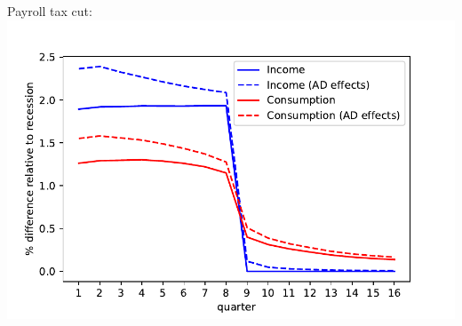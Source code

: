 \documentclass[pdflatex,aspectratio=169]{beamer}
\begin{document}
{\begin{frame}
\begin{columns}
                \begin{column}{0.50\textwidth}  
                  Payroll tax cut:	
                  \includegraphics[width=1.2\linewidth]{Code/HA-Models/FromPandemicCode/Figures/recession_taxcut_relrecession}
                \end{column}
              \end{columns}
              
            \end{frame}
            


          }{}
\end{document}
